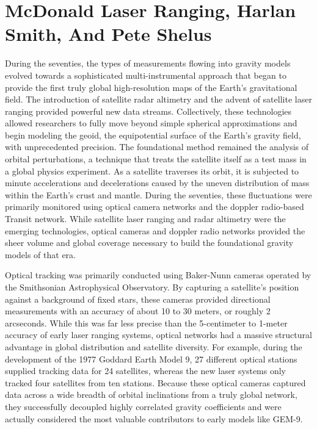 \section{McDonald Laser Ranging, Harlan Smith, And Pete Shelus}

During the seventies, the types of measurements flowing into gravity models evolved towards a sophisticated multi-instrumental approach that began to provide the first truly global high-resolution maps of the Earth’s gravitational field. The introduction of satellite radar altimetry and the advent of satellite laser ranging provided powerful new data streams. Collectively, these technologies allowed researchers to fully move beyond simple spherical approximations and begin modeling the geoid, the equipotential surface of the Earth’s gravity field, with unprecedented precision. The foundational method remained the analysis of orbital perturbations, a technique that treats the satellite itself as a test mass in a global physics experiment. As a satellite traverses its orbit, it is subjected to minute accelerations and decelerations caused by the uneven distribution of mass within the Earth’s crust and mantle. During the seventies, these fluctuations were primarily monitored using optical camera networks and the doppler radio-based Transit network. While satellite laser ranging and radar altimetry were the emerging technologies, optical cameras and doppler radio networks provided the sheer volume and global coverage necessary to build the foundational gravity models of that era.

Optical tracking was primarily conducted using Baker-Nunn cameras operated by the Smithsonian Astrophysical Observatory. By capturing a satellite's position against a background of fixed stars, these cameras provided directional measurements with an accuracy of about 10 to 30 meters, or roughly 2 arcseconds. While this was far less precise than the 5-centimeter to 1-meter accuracy of early laser ranging systems, optical networks had a massive structural advantage in global distribution and satellite diversity. For example, during the development of the 1977 Goddard Earth Model 9, 27 different optical stations supplied tracking data for 24 satellites, whereas the new laser systems only tracked four satellites from ten stations. Because these optical cameras captured data across a wide breadth of orbital inclinations from a truly global network, they successfully decoupled highly correlated gravity coefficients and were actually considered the most valuable contributors to early models like GEM-9.

